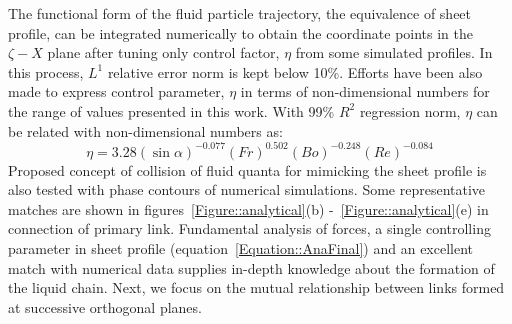 \documentclass[%
 aip,
 sd,%
amsmath,amssymb,
preprint,%
author-year,%
]{revtex4-1}
\begin{document}
The functional form of the fluid particle trajectory, the equivalence of sheet profile, can be integrated numerically to obtain the coordinate points in the $\zeta-X$ plane after tuning only control factor, $\eta$ from some simulated profiles. In this process, $L^1$ relative error norm is kept below 10\%. Efforts have been also made to express control parameter, $\eta$ in terms of non-dimensional numbers for the range of values presented in this work. With 99\% $R^2$ regression norm, $\eta$ can be related with non-dimensional numbers as:
\begin{equation}\label{Equation::eta}
\eta = 3.28(\sin\alpha)^{-0.077}(Fr)^{0.502}(Bo)^{-0.248}\left(Re\right)^{-0.084}
\end{equation}
Proposed concept of collision of fluid quanta for mimicking the sheet profile is also tested with phase contours of numerical simulations. Some representative matches are shown in figures~\ref{Figure::analytical}(b) -~\ref{Figure::analytical}(e) in connection of primary link. Fundamental analysis of forces, a single controlling parameter in sheet profile (equation~\ref{Equation::AnaFinal}) and an excellent match with numerical data supplies in-depth knowledge about the formation of the liquid chain. Next, we focus on the mutual relationship between links formed at successive orthogonal planes. 
\end{document}
